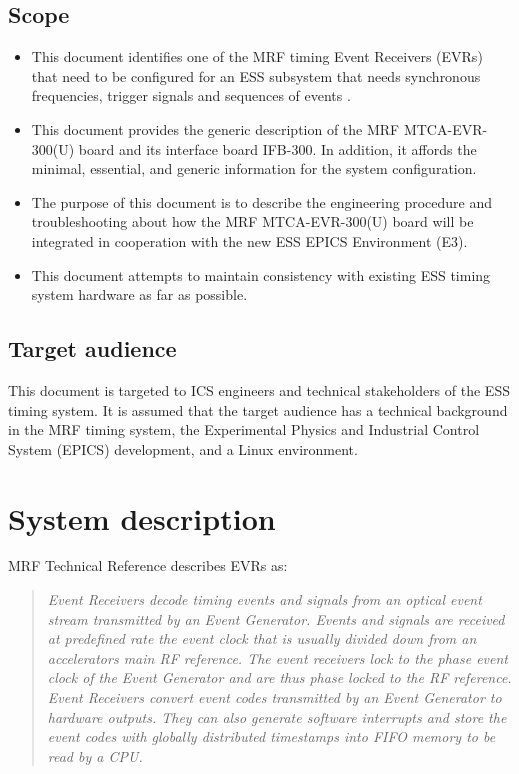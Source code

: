 \documentclass[11pt
  , a4paper
  , article
  , oneside
  , showtrims
]{memoir}
\begin{document}
\section{Scope}
\begin{itemize}
\item This document identifies one of the MRF timing Event Receivers (EVRs) that need to be configured for an ESS subsystem that needs synchronous frequencies, trigger signals and sequences of events \cite{MRFEVENTSYSTEMDC}.
\item This document provides the generic description of the MRF MTCA-EVR-300(U) board and its interface board IFB-300. In addition, it affords the minimal, essential, and generic information for the system configuration.
\item The purpose of this document is to describe the engineering procedure and troubleshooting about how the MRF MTCA-EVR-300(U) board will be integrated in cooperation with the new ESS EPICS Environment (E3).
\item This document attempts to maintain consistency with existing ESS timing system hardware as far as possible.
\end{itemize}


\section{Target audience}
This document is targeted to ICS engineers and technical stakeholders of the ESS timing system. It is assumed that the target audience has a technical background in the MRF timing system, the Experimental Physics and Industrial Control System (EPICS) development, and a Linux environment.\\



\chapter{System description}
MRF Technical Reference \citep[see][p45]{MRFEVENTSYSTEMDC} describes EVRs as:
\blockquote{\textit{Event Receivers decode timing events and signals from an optical event stream transmitted by an Event Generator. Events and signals are received at predefined rate the event clock that is usually divided down from an accelerators main RF reference. The event receivers lock to the phase event clock of the Event Generator and are thus phase locked to the RF reference. Event Receivers convert event codes transmitted by an Event Generator to hardware outputs. They can also generate software interrupts and store the event codes with globally distributed timestamps into FIFO memory to be read by a CPU.}}
\end{document}
